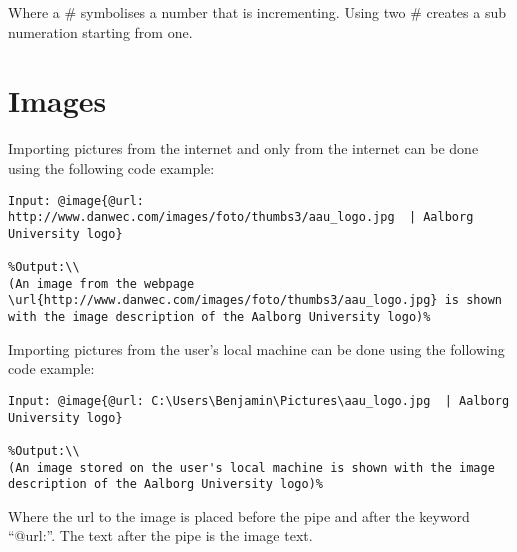 Where a \# symbolises a number that is incrementing. Using two \# creates a sub numeration starting from one.

\section{Images}
Importing pictures from the internet and only from the internet can be done using the following code example:
\begin{lstlisting}[frame=single]
Input: @image{@url: http://www.danwec.com/images/foto/thumbs3/aau_logo.jpg  | Aalborg University logo}

%Output:\\
(An image from the webpage \url{http://www.danwec.com/images/foto/thumbs3/aau_logo.jpg} is shown with the image description of the Aalborg University logo)%
\end{lstlisting}
Importing pictures from the user's local machine can be done using the following code example:
\begin{lstlisting}[frame=single]
Input: @image{@url: C:\Users\Benjamin\Pictures\aau_logo.jpg  | Aalborg University logo}

%Output:\\
(An image stored on the user's local machine is shown with the image description of the Aalborg University logo)%
\end{lstlisting}

Where the url to the image is placed before the pipe and after the keyword ``@url:''. The text after the pipe is the image text.